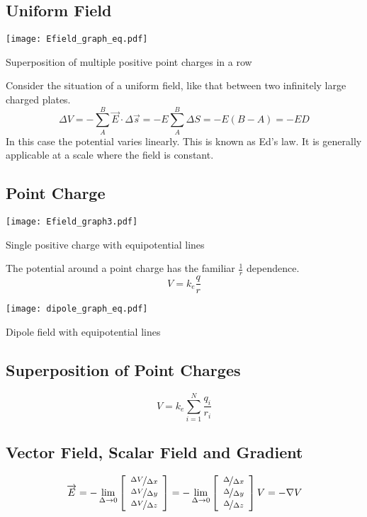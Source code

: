   \newpage
  
  \subsection{Uniform Field}
  \begin{marginfigure}[-10pt]%
  \texttt{[image: Efield\_graph\_eq.pdf]}
  \caption{Superposition of multiple positive point charges in a row}
  \label{fig:marginfig}
\end{marginfigure}
  Consider the situation of a uniform field, like that between two infinitely large charged plates.
  $$\Delta V=-\sum_A^B \overrightarrow{E}\cdot \Delta \overrightarrow{s}=-E\sum_A^B \Delta S=-E (B-A)=-ED$$
  In this case the potential varies linearly.  This is known as Ed's law.  It is generally applicable at a scale where the field is constant.
  \subsection{Point Charge}
  \begin{marginfigure}[0pt]%
  \texttt{[image: Efield\_graph3.pdf]}
  \caption{Single positive charge with equipotential lines}
  \label{fig:marginfig}
\end{marginfigure}
  The potential around a point charge has the familiar $\frac{1}{r}$ dependence.
$$V=k_e\frac{q}{r} $$

\begin{marginfigure}[0pt]%
  \texttt{[image: dipole\_graph\_eq.pdf]}
  \caption{Dipole field with equipotential lines}
  \label{fig:marginfig}
\end{marginfigure}

\subsection{Superposition of Point Charges}
$$V=k_e\sum_{i=1}^{N} \frac{q_i}{r_i} $$




   \subsection{Vector Field, Scalar Field and Gradient}
     $$\overrightarrow{E}=-\lim_{\Delta \rightarrow 0}\left[\begin{array}{c} \nicefrac{\Delta V}{\Delta x} \\ \nicefrac{\Delta V}{\Delta y} \\ \nicefrac{\Delta V}{\Delta z}\end{array}\right]=-\lim_{\Delta \rightarrow 0}\left[\begin{array}{c} \nicefrac{\Delta }{\Delta x} \\ \nicefrac{\Delta }{\Delta y} \\ \nicefrac{\Delta }{\Delta z}\end{array}\right]V=-\nabla{V}$$
